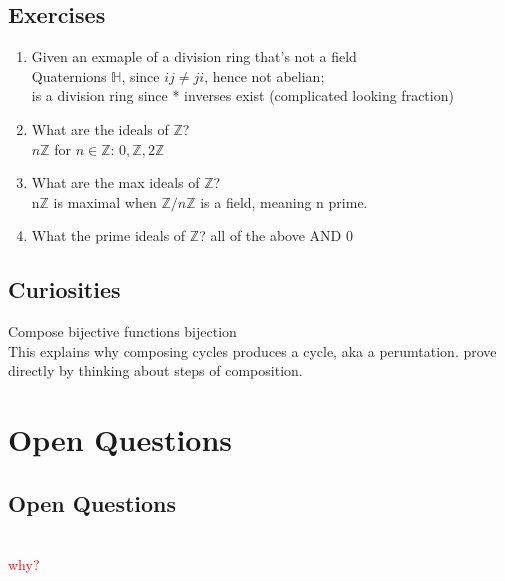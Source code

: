 \documentclass[12pt]{article}
\begin{document}
\subsection*{Exercises}
\begin{enumerate}
    \item Given an exmaple of a division ring that's not a field\\
    \textcolor[gray]{0.5}{Quaternions $\mathbb{H}$, since $ij \neq ji$, hence not abelian;\\ is a division ring since * inverses exist (complicated looking fraction)}

    \item What are the ideals of $\mathbb{Z}$?\\
    \textcolor[gray]{0.5}{$n\mathbb{Z}$ for $n \in \mathbb{Z}$: $0, \mathbb{Z}, 2\mathbb{Z}$ }

    \item What are the max ideals of $\mathbb{Z}$?\\
    \textcolor[gray]{0.5}{n$\mathbb{Z}$ is maximal when $\mathbb{Z} / n \mathbb{Z}$ is a field, meaning n prime.}

    \item What the prime ideals of $\mathbb{Z}$?
    \textcolor[gray]{0.5}{all of the above AND 0}

\end{enumerate}


\subsection*{Curiosities}

Compose bijective functions bijection\\
This explains why composing cycles produces a cycle, aka a perumtation.
\textcolor[gray]{0.5}{prove directly by thinking about steps of composition.}
\section*{Open Questions}

\subsection*{Open Questions}
\centerline{}\\
\textcolor{red}{why?}
\end{document}
